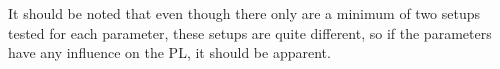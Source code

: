 \begin{table}[H]
\centering
\caption{Difference bewteen setups of different parameters.}
\label{App3}
\end{table}


It should be noted that even though there only are a minimum of two setups tested for each parameter, these setups are quite different, so if the parameters have any influence on the PL, it should be apparent. 






 

